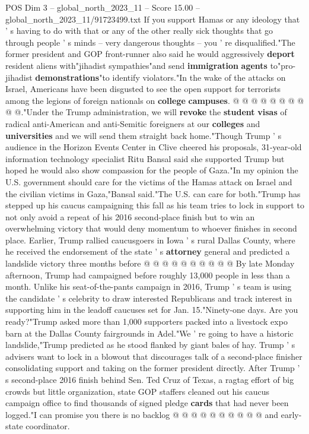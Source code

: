 \begin{textsample}{POS Dim 3 – global\_north\_2023\_11 – Score 15.00 – global\_north\_2023\_11/91723499.txt}
If you support Hamas or any ideology that ' s having to do with that or any of the other really sick thoughts that go through people ' s minds -- very dangerous thoughts -- you ' re disqualified."The former president and GOP front-runner also said he would aggressively \textbf{deport} resident aliens with"jihadist sympathies"and send \textbf{immigration} \textbf{agents} to"pro-jihadist \textbf{demonstrations}"to identify violators."In the wake of the attacks on Israel, Americans have been disgusted to see the open support for terrorists among the legions of foreign nationals on \textbf{college} \textbf{campuses}. @ @ @ @ @ @ @ @ @ @."Under the Trump administration, we will \textbf{revoke} the \textbf{student} \textbf{visas} of radical anti-American and anti-Semitic foreigners at our \textbf{colleges} and \textbf{universities} and we will send them straight back home."Though Trump ' s audience in the Horizon Events Center in Clive cheered his proposals, 31-year-old information technology specialist Ritu Bansal said she supported Trump but hoped he would also show compassion for the people of Gaza."In my opinion the U.S. government should care for the victims of the Hamas attack on Israel and the civilian victims in Gaza,"Bansal said."The U.S. can care for both."Trump has stepped up his caucus campaigning this fall as his team tries to lock in support to not only avoid a repeat of his 2016 second-place finish but to win an overwhelming victory that would deny momentum to whoever finishes in second place.
Earlier, Trump rallied caucusgoers in Iowa ' s rural Dallas County, where he received the endorsement of the state ' s \textbf{attorney} general and predicted a landslide victory three months before @ @ @ @ @ @ @ @ @ @ By late Monday afternoon, Trump had campaigned before roughly 13,000 people in less than a month.
Unlike his seat-of-the-pants campaign in 2016, Trump ' s team is using the candidate ' s celebrity to draw interested Republicans and track interest in supporting him in the leadoff caucuses set for Jan. 15."Ninety-one days.
Are you ready?"Trump asked more than 1,000 supporters packed into a livestock expo barn at the Dallas County fairgrounds in Adel."We ' re going to have a historic landslide,"Trump predicted as he stood flanked by giant bales of hay.
Trump ' s advisers want to lock in a blowout that discourages talk of a second-place finisher consolidating support and taking on the former president directly.
After Trump ' s second-place 2016 finish behind Sen.
Ted Cruz of Texas, a ragtag effort of big crowds but little organization, state GOP staffers cleaned out his caucus campaign office to find thousands of signed pledge \textbf{cards} that had never been logged."I can promise you there is no backlog @ @ @ @ @ @ @ @ @ @ and early-state coordinator.

\end{textsample}

